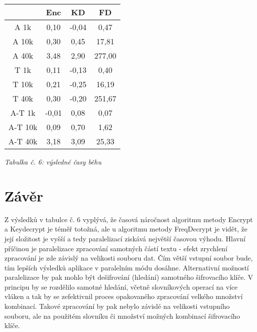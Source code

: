 \documentclass{article}
\begin{document}
\begin{center}
	\begin{tabular}{ c | c | c | c }
		 & Enc & KD & FD \\
		\hline
		\hline
		A 1k & 0,10 & -0,04 & 0,47 \\
		\hline
		A 10k & 0,30 & 0,45 & 17,81 \\
		\hline
		A 40k & 3,48 & 2,90 & 277,00 \\
		\hline
		T 1k & 0,11 & -0,13 & 0,40 \\
		\hline
		T 10k & 0,21 & -0,25 & 16,19 \\
		\hline
		T 40k & 0,30 & -0,20 & 251,67 \\
		\hline
		A-T 1k & -0,01 & 0,08 & 0,07 \\
		\hline
		A-T 10k & 0,09 & 0,70 & 1,62 \\
		\hline
		A-T 40k & 3,18 & 3,09 & 25,33 \\
	\end{tabular}
	\newline
	\textit{Tabulka č. 6: výsledné časy běhu}
\end{center}

\section{Závěr}
Z výsledků v tabulce č. 6 vyplývá, že časová náročnost algoritmu metody Encrypt a Keydecrypt je téměř totožná, ale u algoritmu metody FreqDecrypt je vidět, že její složitost je vyšší a tedy paralelizací ziskává největší časovou výhodu. Hlavní příčinou je paralelizace zpracování samotných částí textu - efekt zrychlení zpracování je zde závislý na velikosti souboru dat. Čím větší vstupní soubor bude, tím lepších výsledků aplikace v paralelním módu dosáhne.
Alternativní možností paralelizace by pak mohlo být dešifrování (hledání) samotného šifrovacího klíče. V principu by se rozdělilo samotné hledání, včetně slovníkových operací na více vláken a tak by se zefektivnil proces opakovaného zpracování velkého množství kombinací. Takové zpracování by pak nebylo závislé na velikosti vstupního souboru, ale na použitém slovníku či množství možných kombinací šifrovacího klíče.
\end{document}
